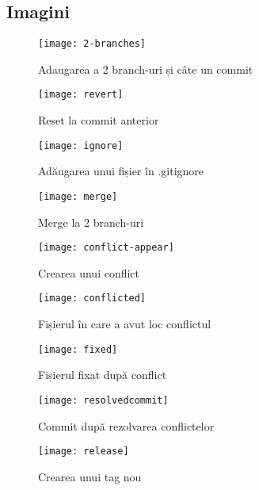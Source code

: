 \subsection{Imagini}
\begin{center}
	\begin{figure}[h]
		\centering
		\texttt{[image: 2-branches]}\\
		\caption{Adaugarea a 2 branch-uri și câte un commit}
		\label{2-branches}
	\end{figure}
	\begin{figure}[h]
		\centering
		\texttt{[image: revert]}\\
		\caption{Reset la commit anterior}
		\label{revert}
	\end{figure}
	\begin{figure}[h]
		\centering
		\texttt{[image: ignore]}\\
		\caption{Adăugarea unui fișier în .gitignore}
		\label{ignore}
	\end{figure}
	\begin{figure}[h]
		\centering
		\texttt{[image: merge]}\\
		\caption{Merge la 2 branch-uri}
		\label{merge}
	\end{figure}
	\begin{figure}[h]
		\centering
		\texttt{[image: conflict-appear]}\\
		\caption{Crearea unui conflict}
		\label{conflict-appear}
	\end{figure}
	\begin{figure}[h]
		\centering
		\texttt{[image: conflicted]}\\
		\caption{Fișierul în care a avut loc conflictul}
		\label{conflicted}
	\end{figure}
	\begin{figure}[h]
		\centering
		\texttt{[image: fixed]}\\
		\caption{Fișierul fixat după conflict}
		\label{fixed}
	\end{figure}
	\begin{figure}[h]
		\centering
		\texttt{[image: resolvedcommit]}\\
		\caption{Commit după rezolvarea conflictelor}
		\label{resolvedcommit}
	\end{figure}
	\begin{figure}[h]
		\centering
		\texttt{[image: release]}\\
		\caption{Crearea unui tag nou}
		\label{release}
	\end{figure}
\end{center}

\clearpage
